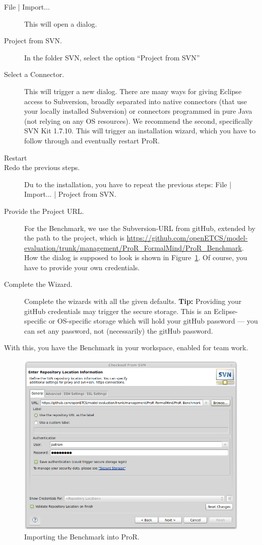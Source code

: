 \documentclass{template/openetcs_report}
\begin{document}
\begin{description}
\item[File | Import...] This will open a dialog.
\item[Project from SVN.] In the folder SVN, select the option ``Project from SVN''
\item[Select a Connector.] This will trigger a new dialog.  There are many ways for giving Eclipse access to Subversion, broadly separated into native connectors (that use your locally installed Subversion) or connectors programmed in pure Java (not relying on any OS resources).  We recommend the second, specifically SVN Kit 1.7.10.  This will trigger an installation wizard, which you have to follow through and eventually restart ProR.
\item[Restart]
\item[Redo the previous steps.]  Du to the installation, you have to repeat the previous steps: File | Import... | Project from SVN.
\item[Provide the Project URL.] For the Benchmark, we use the Subversion-URL from gitHub, extended by the path to the project, which is \url{https://github.com/openETCS/model-evaluation/trunk/management/ProR_FormalMind/ProR_Benchmark}.  How the dialog is supposed to look is shown in Figure~\ref{fig:svn-config}.  Of course, you have to provide your own credentials.
\item[Complete the Wizard.]  Complete the wizards with all the given defaults.   \textbf{Tip:} Providing your gitHub credentials may trigger the secure storage.  This is an Eclipse-specific or OS-specific storage which will hold your gitHub password --- you can set any password, not (necessarily) the gitHub password.

\end{description}

With this, you have the Benchmark in your workspace, enabled for team work.

\begin{figure}[h!]
	\begin{center}
	\includegraphics[width=.8\textwidth]{img/svn-config.png}
	\end{center}
	\caption{Importing the Benchmark into ProR.}
	\label{fig:svn-config}
\end{figure}
\end{document}
